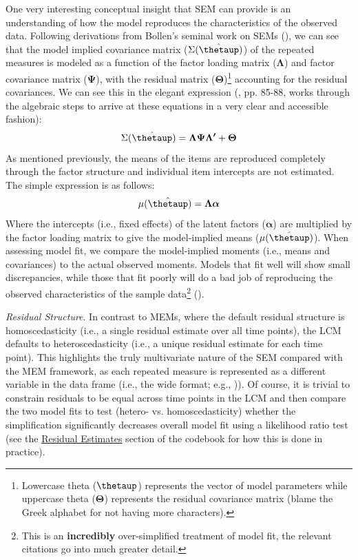 \documentclass[11pt]{article}
\begin{document}
One very interesting conceptual insight that SEM can provide is an understanding of how the model reproduces the characteristics of the observed data. Following derivations from Bollen’s seminal work on SEMs (\citeyear{bollen_structural_1989}), we can see that the model implied covariance matrix ($\Sigma(\hat{\boldsymbol{\thetaup}})$) of the repeated measures is modeled as a function of the factor loading matrix ($\boldsymbol{\Lambda}$) and factor covariance matrix ($\boldsymbol{\Psi}$), with the residual matrix ($\boldsymbol{\Theta}$)\footnote{Lowercase theta ($\boldsymbol{\thetaup}$) represents the vector of model parameters while uppercase theta ($\boldsymbol{\Theta}$) represents the residual covariance matrix (blame the Greek alphabet for not having more characters).} accounting for the residual covariances. We can see this in the elegant expression (\cite{bollen_structural_1989}, pp. 85-88, works through the algebraic steps to arrive at these equations in a very clear and accessible fashion):
%
\begin{equation} \label{eq:12}
\Sigma(\hat{\boldsymbol{\thetaup}}) = \boldsymbol{\Lambda\Psi\Lambda^{\prime}} + \boldsymbol{\Theta}  
\end{equation}
%
As mentioned previously, the means of the items are reproduced completely through the factor structure and individual item intercepts are not estimated. The simple expression is as follows:
%
\begin{equation} \label{eq:13}
\mu(\hat{\boldsymbol{\thetaup}}) = \boldsymbol{\Lambda\alpha}
\end{equation}
%
Where the intercepts (i.e., fixed effects) of the latent factors ($\boldsymbol{\alpha}$) are multiplied by the factor loading matrix to give the model-implied means ($\mu(\hat{\boldsymbol{\thetaup}})$). When assessing model fit, we compare the model-implied moments (i.e., means and covariances) to the actual observed moments. Models that fit well will show small discrepancies, while those that fit poorly will do a bad job of reproducing the observed characteristics of the sample data\footnote{This is an \textbf{incredibly} over-simplified treatment of model fit, the relevant citations go into much greater detail.} (\cite{hu_fit_1998,jackson_reporting_2009,mcneish_dynamic_2021}).

\qquad \textit{Residual Structure}. In contrast to MEMs, where the default residual structure is homoscedasticity (i.e., a single residual estimate over all time points), the LCM defaults to heteroscedasticity (i.e., a unique residual estimate for each time point). This highlights the truly multivariate nature of the SEM compared with the MEM framework, as each repeated measure is represented as a different variable in the data frame (i.e., the wide format; e.g., \cite{hamaker_fixed_2020})). Of course, it is trivial to constrain residuals to be equal across time points in the LCM and then compare the two model fits to test (hetero- vs. homoscedasticity) whether the simplification significantly decreases overall model fit using a likelihood ratio test (see the \href{https://e-m-mccormick.github.io/static/longitudinal-primer/03-time.html#residual-estimates}{Residual Estimates} section of the codebook for how this is done in practice).
\end{document}
